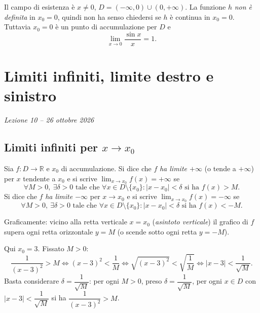 \documentclass[11pt,a4paper]{article}
\begin{document}
\begin{esempio}[$h(x) = \dfrac{\sin x}{x}$]
Il campo di esistenza è $x \neq 0$, $D = (-\infty, 0) \cup (0, +\infty)$. La funzione $h$ \emph{non è definita} in $x_0 = 0$, quindi non ha senso chiedersi se $h$ è continua in $x_0 = 0$. Tuttavia $x_0 = 0$ è un punto di accumulazione per $D$ e
\[
\lim_{x \to 0} \frac{\sin x}{x} = 1 .
\]
\end{esempio}

\section[Limiti infiniti, limite destro e sinistro (Lezione 10 -- 26 ottobre 2026)]{Limiti infiniti, limite destro e sinistro}
\noindent\emph{Lezione 10 -- 26 ottobre 2026}
\subsection{Limiti infiniti per $x \to x_0$}

\begin{definizione}
Sia $f : D \to \mathbb{R}$ e $x_0$ di accumulazione. Si dice che $f$ \emph{ha limite $+\infty$} (o tende a $+\infty$) per $x$ tendente a $x_0$ e si scrive $\displaystyle\lim_{x\to x_0} f(x) = +\infty$ se
\[
\forall M > 0,\ \exists \delta > 0 \text{ tale che } \forall x \in D \setminus \{x_0\} : |x - x_0| < \delta \text{ si ha } f(x) > M .
\]
Si dice che $f$ \emph{ha limite $-\infty$} per $x \to x_0$ e si scrive $\displaystyle\lim_{x\to x_0} f(x) = -\infty$ se
\[
\forall M > 0,\ \exists \delta > 0 \text{ tale che } \forall x \in D \setminus \{x_0\} : |x - x_0| < \delta \text{ si ha } f(x) < -M .
\]
\end{definizione}

Graficamente: vicino alla retta verticale $x = x_0$ (\emph{asintoto verticale}) il grafico di $f$ supera ogni retta orizzontale $y = M$ (o scende sotto ogni retta $y = -M$).

\begin{esempio}[$\lim_{x\to 3}\frac{1}{(x-3)^2} = +\infty$]
Qui $x_0 = 3$. Fissato $M > 0$:
\[
\frac{1}{(x-3)^2} > M \iff (x-3)^2 < \frac{1}{M} \iff \sqrt{(x-3)^2} < \sqrt{\frac{1}{M}} \iff |x - 3| < \frac{1}{\sqrt{M}} .
\]
Basta considerare $\delta = \dfrac{1}{\sqrt{M}}$: per ogni $M > 0$, preso $\delta = \dfrac{1}{\sqrt M}$, per ogni $x \in D$ con $|x - 3| < \dfrac{1}{\sqrt M}$ si ha $\dfrac{1}{(x-3)^2} > M$.
\end{esempio}
\end{document}
